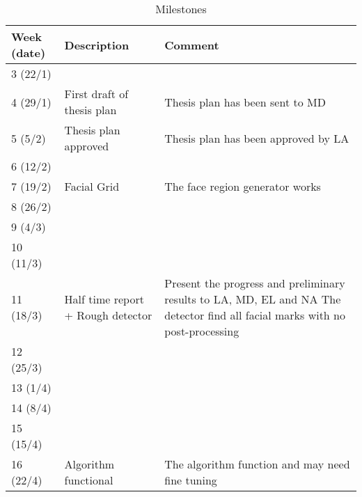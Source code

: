 \begin{table}[H]
\centering
\caption{Milestones}
\label{table:milestones}
\begin{tabular}{|p{}|p{}|p{}|}
	\hline
	\textbf{Week (date)} & \textbf{Description}                  & \textbf{Comment}                                                                                                                      \\ \hline
	3 (22/1)             &                                       &  \\ \hline
	4 (29/1)             & First draft of thesis plan            & Thesis plan has been sent to MD                                                                                                       \\ \hline
	5 (5/2)              & Thesis plan approved                  & Thesis plan has been approved by LA                                                                                                   \\ \hline
	6 (12/2)             &                                       &  \\ \hline
	7 (19/2)             & Facial Grid                           & The face region generator works                                                                                                       \\ \hline
	8 (26/2)             &                                       &  \\ \hline
	9 (4/3)              &                                       &  \\ \hline
	10 (11/3)            &                                       &  \\ \hline
	11 (18/3)            & Half time report + Rough detector     & Present the progress and preliminary results to LA, MD, EL and NA \newline The detector find all facial marks with no post-processing \\ \hline
	12 (25/3)            &                                       &  \\ \hline
	13 (1/4)             &                                       &  \\ \hline
	14 (8/4)             &                                       &  \\ \hline
	15 (15/4)            &                                       &  \\ \hline
	16 (22/4)            & Algorithm functional                  & The algorithm function and may need fine tuning                                                                                       \\ \hline

\end{tabular}
\end{table}
